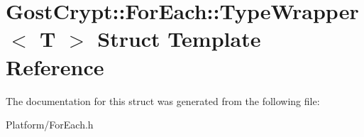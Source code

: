 \hypertarget{struct_gost_crypt_1_1_for_each_1_1_type_wrapper}{}\section{Gost\+Crypt\+:\+:For\+Each\+:\+:Type\+Wrapper$<$ T $>$ Struct Template Reference}
\label{struct_gost_crypt_1_1_for_each_1_1_type_wrapper}


The documentation for this struct was generated from the following file\+:\begin{DoxyCompactItemize}
\item 
Platform/For\+Each.\+h\end{DoxyCompactItemize}
